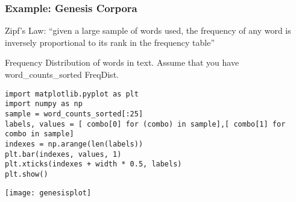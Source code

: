 


\begin{frame}[fragile]\frametitle{Example: Genesis Corpora}
Zipf's Law: ``given a large sample of words used, the frequency of any word is inversely proportional to its rank in the frequency table''

Frequency Distribution of words in text. Assume that you have word\_counts\_sorted FreqDist.

{\scriptsize
\begin{lstlisting}
import matplotlib.pyplot as plt
import numpy as np
sample = word_counts_sorted[:25]
labels, values = [ combo[0] for (combo) in sample],[ combo[1] for combo in sample]
indexes = np.arange(len(labels))
plt.bar(indexes, values, 1)
plt.xticks(indexes + width * 0.5, labels)
plt.show()
\end{lstlisting}}
\begin{center}
\texttt{[image: genesisplot]}
\end{center}
\end{frame}

